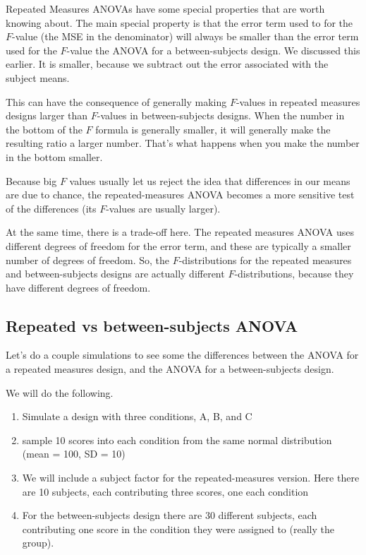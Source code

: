\documentclass[
  letterpaper,
  DIV=11,
  numbers=noendperiod]{scrreprt}
\providecommand{\tightlist}{%
  \setlength{\itemsep}{0pt}\setlength{\parskip}{0pt}}
\begin{document}
Repeated Measures ANOVAs have some special properties that are worth
knowing about. The main special property is that the error term used to
for the \(F\)-value (the MSE in the denominator) will always be smaller
than the error term used for the \(F\)-value the ANOVA for a
between-subjects design. We discussed this earlier. It is smaller,
because we subtract out the error associated with the subject means.

This can have the consequence of generally making \(F\)-values in
repeated measures designs larger than \(F\)-values in between-subjects
designs. When the number in the bottom of the \(F\) formula is generally
smaller, it will generally make the resulting ratio a larger number.
That's what happens when you make the number in the bottom smaller.

Because big \(F\) values usually let us reject the idea that differences
in our means are due to chance, the repeated-measures ANOVA becomes a
more sensitive test of the differences (its \(F\)-values are usually
larger).

At the same time, there is a trade-off here. The repeated measures ANOVA
uses different degrees of freedom for the error term, and these are
typically a smaller number of degrees of freedom. So, the
\(F\)-distributions for the repeated measures and between-subjects
designs are actually different \(F\)-distributions, because they have
different degrees of freedom.

\subsection{Repeated vs between-subjects
ANOVA}\label{repeated-vs-between-subjects-anova}

Let's do a couple simulations to see some the differences between the
ANOVA for a repeated measures design, and the ANOVA for a
between-subjects design.

We will do the following.

\begin{enumerate}
\def\labelenumi{\arabic{enumi}.}
\tightlist
\item
  Simulate a design with three conditions, A, B, and C
\item
  sample 10 scores into each condition from the same normal distribution
  (mean = 100, SD = 10)
\item
  We will include a subject factor for the repeated-measures version.
  Here there are 10 subjects, each contributing three scores, one each
  condition
\item
  For the between-subjects design there are 30 different subjects, each
  contributing one score in the condition they were assigned to (really
  the group).
\end{enumerate}
\end{document}
